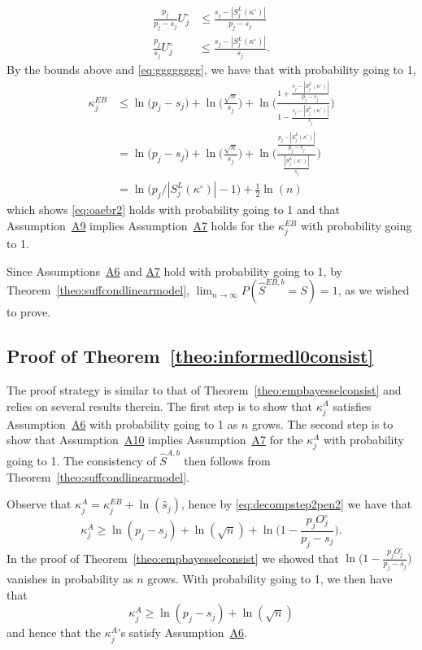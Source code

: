 \documentclass[bj,authoryear]{imsart}
\theoremstyle{plain}
\begin{document}
\begin{align}
    \frac{p_j}{p_j-s_j}U^{\circ}_j &\leq \frac{s_j-|S^{L}_j(\kappa^{\circ})|}{p_j-s_j}\nonumber\\
    \frac{p_j}{s_j}U^{\circ}_j &\leq  \frac{s_j-|S^{L}_j(\kappa^{\circ})|}{s_j}. \label{eq:gewou}
\end{align}
By the bounds above and \eqref{eq:gggggggg}, we have that with probability going to 1,
\begin{align*}
  \kappa^{EB}_j 
  &\leq \ln\big(p_j-s_j\big)+\ln\Big(\frac{\sqrt{n}}{s_j}\Big)+\ln\Bigg(\frac{1+\frac{s_j-|S^{L}_j(\kappa^{\circ})|}{p_j-s_j}}{1- \frac{s_j-|S^{L}_j(\kappa^{\circ})|}{s_j}}\Bigg) \nonumber\\
  &= \ln\big(p_j-s_j\big) + \ln\Big(\frac{\sqrt{n}}{s_j}\Big) + \ln\Bigg(\frac{\frac{p_j-|S^{L}_j(\kappa^{\circ})|}{p_j-s_j}}{ \frac{|S^{L}_j(\kappa^{\circ})|}{s_j}}\Bigg) \\
&=\ln\big(p_j/|S^{L}_j(\kappa^{\circ})|-1\big)+\frac{1}{2}\ln(n)\label{eq:finalupperboundkappaj}
\end{align*}
which shows \eqref{eq:oaebr2} holds with probability going to 1 and that
Assumption~\hyperlink{lab:A9}{A9} implies Assumption~\hyperlink{lab:A7}{A7} holds for the $\kappa^{EB}_j$ with probability going to 1. 

Since Assumptions~\hyperlink{lab:A6}{A6} and \hyperlink{lab:A7}{A7} hold with probability going to 1, by Theorem~\ref{theo:suffcondlinearmodel}, $\lim_{n\to\infty}P(\hat{S}^{EB,b}= S)= 1$, as we wished to prove.

\subsection{Proof of Theorem~\ref{theo:informedl0consist}} The proof strategy is similar to that of Theorem~\ref{theo:empbayesselconsist} and relies on several results therein. The first step is to show that $\kappa^{A}_j$ satisfies Assumption~\hyperlink{lab:A6}{A6} with probability going to 1 as $n$ grows. The second step is to show that Assumption~\hyperlink{lab:A10}{A10} implies Assumption~\hyperlink{lab:A7}{A7} for the $\kappa^{A}_j$ with probability going to 1. The consistency of $\hat S^{A,b}$ then follows from Theorem~\ref{theo:suffcondlinearmodel}.

Observe that $\kappa_j^{A}=\kappa_j^{EB}+\ln(\widehat s_j)$, hence by \eqref{eq:decompstep2pen2} we have that
\begin{equation*}
    \kappa_j^{A}
    \geq  \ln(p_j-s_j)+\ln(\sqrt{n})+\ln\Big(1-\frac{p_j O^{\circ}_j}{p_j-s_j}\Big).
\end{equation*}
In the proof of Theorem~\ref{theo:empbayesselconsist} we showed that $\ln\Big(1-\frac{p_j O^{\circ}_j}{p_j-s_j}\Big)$ vanishes in probability as $n$ grows. With probability going to 1, we then have that
\begin{equation}\label{eq:finallowerboundkappaj2}\kappa^{A}_j 
    \geq  \ln(p_j-s_j)+\ln(\sqrt{n})
\end{equation}
and hence that the $\kappa^{A}_j$'s satisfy Assumption~\hyperlink{lab:A6}{A6}.
\end{document}
